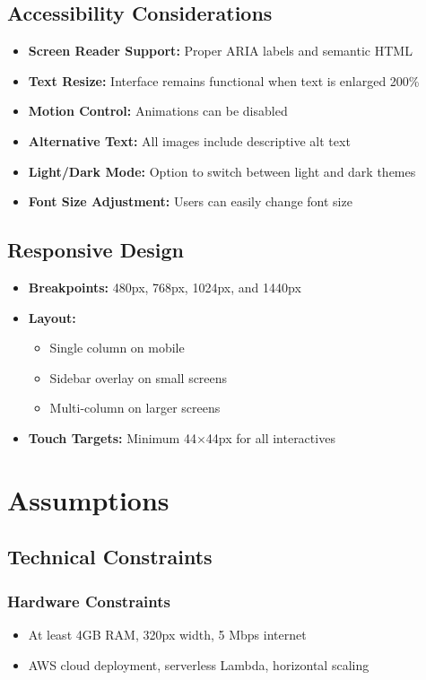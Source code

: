 \documentclass[a4paper, 11pt]{scrreprt}
\begin{document}
\section{Accessibility Considerations}
\begin{itemize}
    \item \textbf{Screen Reader Support:} Proper ARIA labels and semantic HTML
    \item \textbf{Text Resize:} Interface remains functional when text is enlarged 200\%
    \item \textbf{Motion Control:} Animations can be disabled
    \item \textbf{Alternative Text:} All images include descriptive alt text
    \item \textbf{Light/Dark Mode:} Option to switch between light and dark themes
    \item \textbf{Font Size Adjustment:} Users can easily change font size
\end{itemize}

\section{Responsive Design}
\begin{itemize}
    \item \textbf{Breakpoints:} 480px, 768px, 1024px, and 1440px
    \item \textbf{Layout:} 
    \begin{itemize}
        \item Single column on mobile
        \item Sidebar overlay on small screens
        \item Multi-column on larger screens
    \end{itemize}
    \item \textbf{Touch Targets:} Minimum 44$\times$44px for all interactives
\end{itemize}

\chapter{Assumptions}

\section{Technical Constraints}
\subsection{Hardware Constraints}
\begin{itemize}
    \item At least 4GB RAM, 320px width, 5 Mbps internet
    \item AWS cloud deployment, serverless Lambda, horizontal scaling
\end{itemize}
\end{document}
